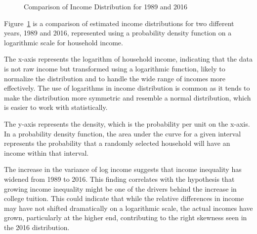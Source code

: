 \documentclass[
  letterpaper,
  DIV=11,
  numbers=noendperiod]{scrartcl}
\begin{document}
\begin{figure}


\caption{\label{fig-log}Comparison of Income Distribution for 1989 and
2016}

\end{figure}%

Figure~\ref{fig-log} is a comparison of estimated income distributions
for two different years, 1989 and 2016, represented using a probability
density function on a logarithmic scale for household income.

The x-axis represents the logarithm of household income, indicating that
the data is not raw income but transformed using a logarithmic function,
likely to normalize the distribution and to handle the wide range of
incomes more effectively. The use of logarithms in income distribution
is common as it tends to make the distribution more symmetric and
resemble a normal distribution, which is easier to work with
statistically.

The y-axis represents the density, which is the probability per unit on
the x-axis. In a probability density function, the area under the curve
for a given interval represents the probability that a randomly selected
household will have an income within that interval.

The increase in the variance of log income suggests that income
inequality has widened from 1989 to 2016. This finding correlates with
the hypothesis that growing income inequality might be one of the
drivers behind the increase in college tuition. This could indicate that
while the relative differences in income may have not shifted
dramatically on a logarithmic scale, the actual incomes have grown,
particularly at the higher end, contributing to the right skewness seen
in the 2016 distribution.
\end{document}
